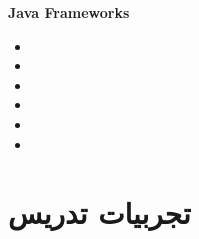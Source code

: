 \documentclass[]{friggeri-cv-fa} %
\begin{document}
\begin{entrylist}
{	\textbf{Java Frameworks}
	\begin{itemize}
		\item {}
		\item {}
		\item {}
		\item {}
		\item {}
		\item {}
	\end{itemize}
}



\end{entrylist}


\section{تجربیات تدریس}
\end{document}
